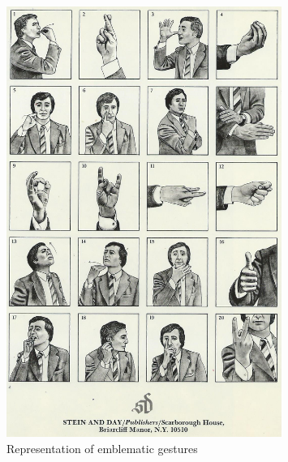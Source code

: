 \begin{figure}
    \centering
    \includegraphics[width=0.80\textwidth]{figures/EmblemsMorris.png}
    \caption{\label{fig:Figure_Emblems_Morris}Representation of emblematic gestures}
\end{figure}
